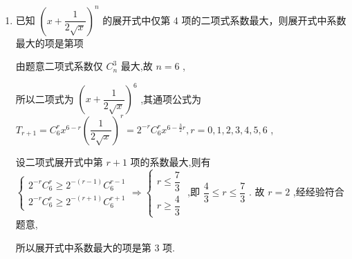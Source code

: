 \begin{enumerate}
\begin{enumerate}
\begin{jieda}
            即 $\left\{  {\begin{array}{l} \dfrac{{12}!}{r!\left( {{12} - r}\right) !} \cdot  {3}^{r} \geq  \dfrac{{12}!}{\left( {r + 1}\right) ! \cdot  \left( {{11} - r}\right) !} \cdot  {3}^{r + 1} \\  \dfrac{{12}!}{r!\left( {{12} - r}\right) !} \cdot  {3}^{r} \geq  \dfrac{{12}!}{\left( {r - 1}\right) !\left( {{13} - r}\right) !} \cdot  {3}^{r - 1} \end{array}\text{ ,解得 }\dfrac{35}{4} \leq  r \leq  \dfrac{39}{4}}\right.$ ,
            
            因为 $r \in  N$ ,故 $r = 9$ ,因此,展开式中系数最大的项为第 10 项.
        \end{jieda}
        
        \item 已知 ${\left( x + \dfrac{1}{2\sqrt{x}}\right) }^{n}$ 的展开式中仅第 4 项的二项式系数最大，则展开式中系数最大的项是第项
        \begin{jieda}
            由题意二项式系数仅 ${{C}}_{n}^{3}$ 最大,故 $n = 6$ ,
            
            所以二项式为 ${\left( x + \dfrac{1}{2\sqrt{x}}\right) }^{6}$ ,其通项公式为 ${{T}}_{r + 1} = {{C}}_{6}^{r}{x}^{6 - r}{\left( \dfrac{1}{2\sqrt{x}}\right) }^{r} = {2}^{-r}{{C}}_{6}^{r}{x}^{6 - \frac{3}{2}r},r = 0,1,2,3,4,5,6$ ,
            
            设二项式展开式中第 $r + 1$ 项的系数最大,则有 $\left\{  \begin{array}{l} {2}^{-r}{{C}}_{6}^{r} \geq  {2}^{-\left( {r - 1}\right) }{{C}}_{6}^{r - 1} \\  {2}^{-r}{{C}}_{6}^{r} \geq  {2}^{-\left( {r + 1}\right) }{{C}}_{6}^{r + 1} \end{array}\right. \Longrightarrow  \left\{  \begin{array}{l} r \leq  \dfrac{7}{3} \\  r \geq  \dfrac{4}{3} \end{array}\right.$ ,即 $\dfrac{4}{3} \leq  r \leq  \dfrac{7}{3}$ . 故 $r = 2$ ,经经验符合题意,
            
            所以展开式中系数最大的项是第 3 项.
        \end{jieda}
        

\end{enumerate}
\end{enumerate}

